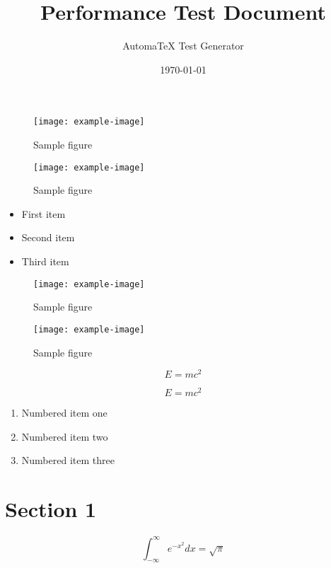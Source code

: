 \documentclass{article}
\title{Performance Test Document}
\author{AutomaTeX Test Generator}
\date{\today}
\begin{document}
\maketitle
\tableofcontents
\newpage

\begin{figure}[h]
    \centering
    \texttt{[image: example-image]}
    \caption{Sample figure}
    \label{fig:sample}
\end{figure}

\begin{figure}[h]
    \centering
    \texttt{[image: example-image]}
    \caption{Sample figure}
    \label{fig:sample}
\end{figure}

\begin{itemize}
\item First item
\item Second item
\item Third item
\end{itemize}

\begin{figure}[h]
    \centering
    \texttt{[image: example-image]}
    \caption{Sample figure}
    \label{fig:sample}
\end{figure}

\begin{figure}[h]
    \centering
    \texttt{[image: example-image]}
    \caption{Sample figure}
    \label{fig:sample}
\end{figure}

\begin{equation}
    E = mc^2
\end{equation}

\begin{equation}
    E = mc^2
\end{equation}


\begin{enumerate}
\item Numbered item one
\item Numbered item two
\item Numbered item three
\end{enumerate}

\section{Section 1}

\begin{equation}
    \int_{-\infty}^{\infty} e^{-x^2} dx = \sqrt{\pi}
\end{equation}
\end{document}
